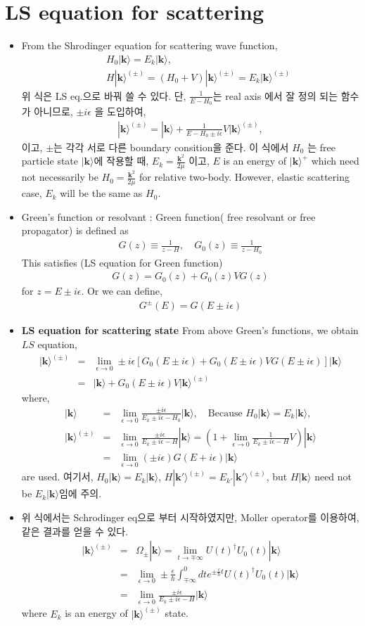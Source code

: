 \documentclass[10pt]{book}
\def\bm{\boldsymbol}
\newcommand{\bea}{\begin{eqnarray}}
\newcommand{\eea}{\end{eqnarray}}
\newcommand{\no}{\nonumber \\}
\def\vk{{\bm k}}
\def\ra{\rangle}
\begin{document}
\section{LS equation for scattering}
\begin{itemize}
\item
From the Shrodinger equation for scattering wave function,
\bea
& &H_0|\vk\ra=E_k|\vk\ra,\no
& &H|\vk\ra^{(\pm)}=(H_0+V)|\vk\ra^{(\pm)} = E_k |\vk\ra^{(\pm)}
\eea
위 식은 LS eq.으로 바꿔 쓸 수 있다. 단, $\frac{1}{E-H_0}$는 
real axis 에서 잘 정의 되는 함수가 아니므로, $\pm i\epsilon$
을 도입하여,
\bea
\boxed{
|\vk\ra^{(\pm)}=|\vk\ra+\frac{1}{E-H_0\pm i\epsilon}V|\vk\ra^{(\pm)},}
\eea
이고, $\pm$는 각각 서로 다른 boundary consition을 준다.
이 식에서  
$H_0$ 는 free particle state $|\vk\ra$에 작용할 때,  $E_k=\frac{\vk^2}{2\mu}$ 이고, 
$E$ is an energy of $|\vk\ra^+$ which 
need not necessarily  be $H_0=\frac{\vk^2}{2\mu}$ 
for relative two-body. However, elastic scattering case, $E_k$ will be the same as $H_0$.

\item Green's function or resolvant : Green function( free resolvant or free propagator) is defined as
\bea
G(z)\equiv\frac{1}{z-H},\quad
G_0(z)\equiv\frac{1}{z-H_0}
\eea
This satisfies (LS equation for Green function) 
\bea
G(z)=G_0(z)+G_0(z)VG(z)
\eea
for $z=E\pm i\epsilon$. Or we can define,
\bea
G^{\pm}(E)=G(E\pm i\epsilon)
\eea
\item {\bf LS equation for scattering state} From above Green's functions,  we obtain $LS$ equation,
\bea
|\vk\ra^{(\pm)}&=&\lim_{\epsilon\to 0} 
       \pm i\epsilon[G_0(E\pm i\epsilon)
                             +G_0(E\pm i\epsilon)V G(E\pm i\epsilon)]|\vk\ra\no 
       &=&|\vk\ra+G_0(E\pm i\epsilon)V|\vk\ra^{(\pm)}
\eea
where, 
\bea
|\vk\ra&=&\lim_{\epsilon\to 0}\frac{\pm i\epsilon}{E_k\pm i\epsilon-H_0}|\vk\ra ,\quad \mbox{Because $H_0|\vk\ra=E_k|\vk\ra$,}\no 
|\vk\ra^{(\pm)}&=&\lim_{\epsilon\to 0}\frac{\pm i\epsilon}{E_k\pm i\epsilon-H}|\vk\ra=(1+\lim_{\epsilon\to 0}\frac{1}{E_k\pm i\epsilon-H} V)|\vk\ra\no
   &=&\lim_{\epsilon\to 0} (\pm i\epsilon) G(E+i\epsilon)|\vk\ra
\eea
are used. 여기서, 
$H_0|\vk\ra=E_k|\vk\ra$, $H|\vk'\ra^{(\pm)}=E_{k'}|\vk'\ra^{(\pm)}$, but 
$H|\vk\ra$ need not be $E_k|\vk\ra $임에 주의.


\item 
위 식에서는 Schrodinger eq으로 부터 시작하였지만, 
Moller operator를 이용하여, 같은 결과를 얻을 수 있다.
\bea
|\vk\ra^{(\pm)}&=&\Omega_{\pm}|\vk\ra
       =\lim_{t\to \mp\infty} U(t)^\dagger U_0(t)|\vk\ra\no 
       &=&\lim_{\epsilon\to 0}\pm\frac{\epsilon}{\hbar}
       \int^0_{\mp\infty} dt
       e^{\pm\frac{\epsilon}{\hbar}t}U(t)^\dagger U_0(t)|\vk\ra\no 
      &=&\lim_{\epsilon\to 0}\frac{\pm i\epsilon}{E_k\pm i\epsilon-H}|\vk\ra
\eea
where $E_k$ is an energy of $|\vk\ra^{(\pm)}$ state.


\end{itemize}
\end{document}
